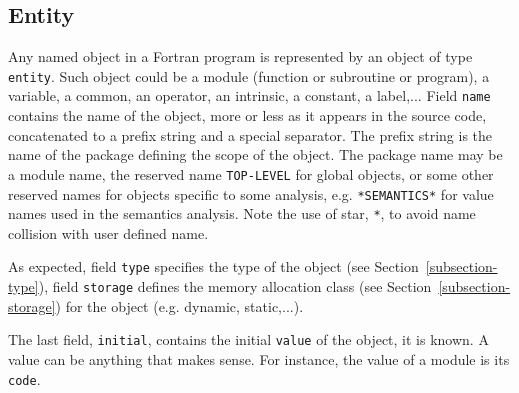 \subsection{Entity}
\label{subsection-entity}


Any named object in a Fortran program is represented by an object of
type {\tt entity}. Such object could be a module (function or subroutine
or program), a variable, a common, an operator, an intrinsic, a
constant, a label,... Field {\tt name} contains the name of the object,
more or less as it appears in the source code, concatenated to a prefix
string and a special separator. The prefix string is the name of the
package defining the scope of the object. The package name may be a
module name, the reserved name {\tt TOP-LEVEL} for global objects, or
some other reserved names for objects specific to some analysis,
e.g. \verb+*SEMANTICS*+ for value names used in the semantics
analysis. Note the use of star, \verb+*+, to avoid name collision with user
defined name.

As expected, field {\tt type} specifies the type of the object (see
Section~\ref{subsection-type}), field {\tt storage} defines the memory
allocation class (see Section~\ref{subsection-storage}) for the object
(e.g. dynamic, static,...).

The last field, {\tt initial}, contains the initial {\tt value} of the
object, it is known. A value can be anything that makes sense. For
instance, the value of a module is its {\tt code}.

\iffalse
Tout objet ayant un nom dans un programme Fortran est repre'sente' par
une \verb/entity/. Un tel objet peut e^tre un module, une variable, un
common, un ope'rateur, une constante, un label, etc. Pour chaque objet,
le sous-domaine \verb/name/ de l'entite' donne le nom de l'objet tel
qu'il apparai^t dans le texte source du programme pre'fixe' par le nom du
package dans lequel l'entite' est de'clare'e, le sous-domaine
\verb/type/ donne le type de l'entite', le sous-domaine \verb/storage/
le genre d'allocation me'moire utilise' pour l'entite', et finalement,
le sous-domaine \verb/initial/ donne la valeur initiale, si elle est
connue, de l'entite'. Le terme valeur initiale a ici un sens assez
large, puisqu'il s'agit par exemple du code pour les entite's
repre'sentant des modules.
\fi


